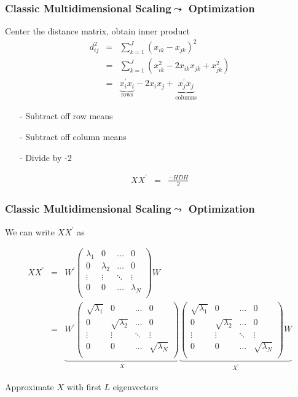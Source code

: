 \begin{frame}[fragile]
\frametitle{Classic Multidimensional Scaling$\leadsto$ Optimization}

Center the distance matrix, obtain inner product 
\begin{eqnarray}
d_{ij}^{2} &= & \sum_{k=1}^{J} (x_{ik} - x_{jk})^{2} \nonumber \\
 &= & \sum_{k=1}^{J} (x_{ik}^2 - 2x_{ik} x_{jk} + x_{jk}^{2} ) \nonumber \\
 & = & \underbrace{{x}_{i}^{'}{x}_{i}}_{\text{rows}} - 2 {x}_{i} {x}_{j} + \underbrace{{x}_{j}^{'}{x}_{j}}_{\text{columns}} \nonumber 
\end{eqnarray}

\begin{itemize}
\item[-] Subtract off row means 
\item[-] Subtract off column means
\item[-] Divide by -2
\end{itemize}

\begin{eqnarray}
{X}{X}^{'} & = & \frac{-{H}{D}{H} \nonumber }{2}
\end{eqnarray}

\end{frame}


\begin{frame}[fragile]
\frametitle{Classic Multidimensional Scaling$\leadsto$ Optimization}

We can write ${X}{X}^{'}$ as

\begin{eqnarray}
{X}{X}^{'} & = & {W}^{'}\begin{pmatrix}
\lambda_{1} & 0 & \hdots &  0 \\
0 & \lambda_{2} & \hdots & 0 \\
\vdots  & \vdots & \ddots & \vdots \\
0 & 0 & \hdots & \lambda_{N} \\
\end{pmatrix} {W} \nonumber \\
& = & \underbrace{{W}^{'} \begin{pmatrix}
\sqrt{\lambda_{1}} & 0 & \hdots &  0 \\
0 & \sqrt{\lambda_{2}} & \hdots & 0 \\
\vdots  & \vdots & \ddots & \vdots \\
0 & 0 & \hdots & \sqrt{\lambda_{N}} \\
\end{pmatrix}}_{{X}} \underbrace{\begin{pmatrix}
\sqrt{\lambda_{1}} & 0 & \hdots &  0 \\
0 & \sqrt{\lambda_{2}} & \hdots & 0 \\
\vdots  & \vdots & \ddots & \vdots \\
0 & 0 & \hdots & \sqrt{\lambda_{N}} \\
\end{pmatrix} {W}}_{{X}^{'}} \nonumber 
\end{eqnarray}

Approximate ${X}$ with first $L$ eigenvectors


\end{frame}


